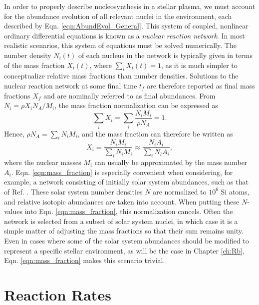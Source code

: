 In order to properly describe nucleosynthesis in a stellar plasma, we must account for the abundance evolution of all relevant nuclei in the environment, each described by Eqn. \ref{eqn:AbundEvol_General}. This system of coupled, nonlinear ordinary differential equations is known as a \emph{nuclear reaction network}. In most realistic scenarios, this system of equations must be solved numerically. The number density $N_{i}(t)$ of each nucleus in the network is typically given in terms of the mass fraction $X_{i}(t)$, where $\sum_{i} X_{i}(t) = 1$, as it is much simpler to conceptualize relative mass fractions than number densities. Solutions to the nuclear reaction network at some final time $t_{f}$ are therefore reported as final mass fractions $X_{f}$ and are nominally referred to as final abundances. From $N_{i} = \rho X_{i} N_{A} / M_{i}$, the mass fraction normalization can be expressed as
\begin{equation}
\sum_{i} X_{i} = \sum_{i} \frac{N_{i}M_{i}}{\rho N_{A}} = 1.
\end{equation}
Hence, $\rho N_{A} = \sum_{i} N_{i}M_{i}$, and the mass fraction can therefore be written as
\begin{equation} \label{eqn:mass_fraction}
X_{i} = \frac{N_{i}M_{i}}{\sum_{i} N_{i}M_{i}} \approx \frac{N_{i}A_{i}}{\sum_{i} N_{i}A_{i}},
\end{equation}
where the nuclear masses $M_{i}$ can usually be approximated by the mass number $A_{i}$. Eqn. \ref{eqn:mass_fraction} is especially convenient when considering, for example, a network consisting of initially solar system abundances, such as that of Ref. \cite{Lodders2009}. These solar system number densities $N$ are normalized to $10^{6}$ Si atoms, and relative isotopic abundances are taken into account. When putting these $N$-values into Eqn. \ref{eqn:mass_fraction}, this normalization cancels. Often the network is selected from a subset of solar system nuclei, in which case it is a simple matter of adjusting the mass fractions so that their sum remains unity. Even in cases where some of the solar system abundances should be modified to represent a specific stellar environment, as will be the case in Chapter \ref{ch:Rb}, Eqn. \ref{eqn:mass_fraction} makes this scenario trivial.


\section{Reaction Rates} \label{sec:rates}


